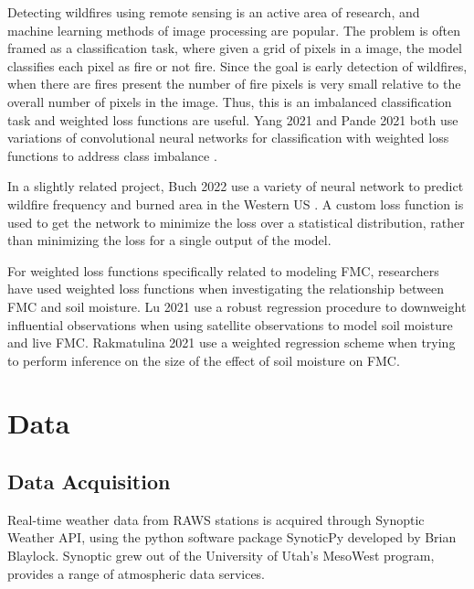 \documentclass[11pt]{article}%
\begin{document}
Detecting wildfires using remote sensing is an active area of research, and machine learning methods of image processing are popular. The problem is often framed as a classification task, where given a grid of pixels in a image, the model classifies each pixel as fire or not fire. Since the goal is early detection of wildfires, when there are fires present the number of fire pixels is very small relative to the overall number of pixels in the image. Thus, this is an imbalanced classification task and weighted loss functions are useful. Yang 2021 and Pande 2021 both use variations of convolutional neural networks for classification with weighted loss functions to address class imbalance \cite{Yang-2021-PFF}\cite{Pande-2021-WSF}.

In a slightly related project, Buch 2022 use a variety of neural network to predict wildfire frequency and burned area in the Western US \cite{Buch-2022-SML}. A custom loss function is used to get the network to minimize the loss over a statistical distribution, rather than minimizing the loss for a single output of the model.

For weighted loss functions specifically related to modeling FMC, researchers have used weighted loss functions when investigating the relationship between FMC and soil moisture. Lu 2021 use a robust regression procedure to downweight influential observations when using satellite observations to model soil moisture and live FMC. \cite{Lu-2021-EMS} Rakmatulina 2021 use a weighted regression scheme when trying to perform inference on the size of the effect of soil moisture on FMC. \cite{Rakhmatulina-2021-SMI}


\section{Data}
\subsection{Data Acquisition}

Real-time weather data from RAWS stations is acquired through Synoptic Weather API, using the python software package SynoticPy developed by Brian Blaylock. \cite{Synoptic-2024-SWA, Blaylock-2023-SPA} Synoptic grew out of the University of Utah's MesoWest program, provides a range of atmospheric data services.
\end{document}
